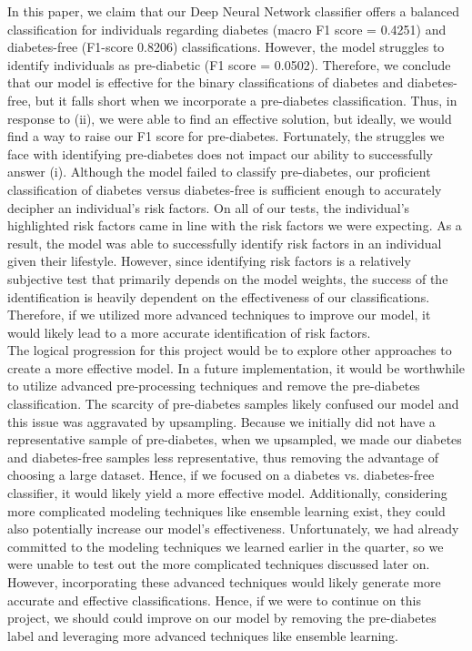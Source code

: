 \documentclass[conference]{IEEEtran}
\begin{document}
In this paper, we claim that our Deep Neural Network classifier offers a balanced classification for individuals regarding diabetes (macro F1 score = 0.4251) and diabetes-free (F1-score 0.8206) classifications. However, the model struggles to identify individuals as pre-diabetic (F1 score = 0.0502). Therefore, we conclude that our model is effective for the binary classifications of diabetes and diabetes-free, but it falls short when we incorporate a pre-diabetes classification. Thus, in response to (ii), we were able to find an effective solution, but ideally, we would find a way to raise our F1 score for pre-diabetes. Fortunately, the struggles we face with identifying pre-diabetes does not impact our ability to successfully answer (i). Although the model failed to classify pre-diabetes, our proficient classification of diabetes versus diabetes-free is sufficient enough to accurately decipher an individual’s risk factors. On all of our tests, the individual’s highlighted risk factors came in line with the risk factors we were expecting. As a result, the model was able to successfully identify risk factors in an individual given their lifestyle. However, since identifying risk factors is a relatively subjective test that primarily depends on the model weights, the success of the identification is heavily dependent on the effectiveness of our classifications. Therefore, if we utilized more advanced techniques to improve our model, it would likely lead to a more accurate identification of risk factors. \\
\indent The logical progression for this project would be to explore other approaches to create a more effective model. In a future implementation, it would be worthwhile to utilize advanced pre-processing techniques and remove the pre-diabetes classification. The scarcity of pre-diabetes samples likely confused our model and this issue was aggravated by upsampling. Because we initially did not have a representative sample of pre-diabetes, when we upsampled, we made our diabetes and diabetes-free samples less representative, thus removing the advantage of choosing a large dataset. Hence, if we focused on a diabetes vs. diabetes-free classifier, it would likely yield a more effective model. Additionally, considering more complicated modeling techniques like ensemble learning exist, they could also potentially increase our model’s effectiveness. Unfortunately, we had already committed to the modeling techniques we learned earlier in the quarter, so we were unable to test out the more complicated techniques discussed later on. However, incorporating these advanced techniques would likely generate more accurate and effective classifications. Hence, if we were to continue on this project, we should could improve on our model by removing the pre-diabetes label and leveraging more advanced techniques like ensemble learning.
\end{document}

